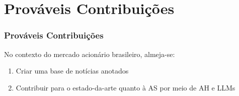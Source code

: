\section{Prováveis Contribuições} %


\begin{frame}
	\frametitle{Prováveis Contribuições}
    No contexto do mercado acionário brasileiro, almeja-se:
    \begin{enumerate}
        \item Criar uma base de notícias anotados
        \item Contribuir para o estado-da-arte quanto à AS por meio de AH e LLMs
    \end{enumerate}
	
\end{frame}

